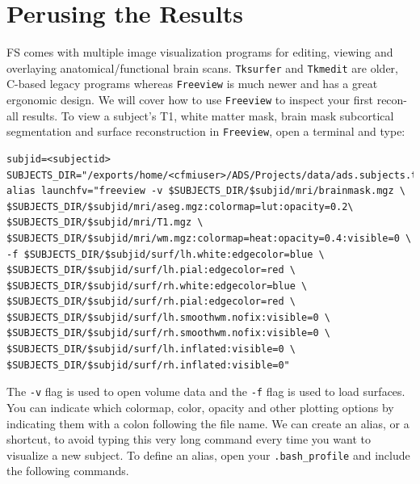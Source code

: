 \documentclass[paper=a4, fontsize=11pt]{scrartcl} %
\numberwithin{equation}{section} %
\numberwithin{figure}{section} %
\numberwithin{table}{section} %
\begin{document}
\section{Perusing the Results}  FS comes with multiple image visualization programs for editing, viewing and overlaying anatomical/functional brain scans.  \texttt{Tksurfer} and \texttt{Tkmedit} are older, C-based legacy programs whereas \texttt{Freeview} is much newer and has a great ergonomic design.  We will cover how to use \texttt{Freeview} to inspect your first recon-all results. To view a subject's T1, white matter mask, brain mask subcortical segmentation and surface reconstruction in \texttt{Freeview}, open a terminal and type:
\begin{lstlisting}[frame=single]
subjid=<subjectid>
SUBJECTS_DIR="/exports/home/<cfmiuser>/ADS/Projects/data/ads.subjects.tutorial"
alias launchfv="freeview -v $SUBJECTS_DIR/$subjid/mri/brainmask.mgz \                                                                               
$SUBJECTS_DIR/$subjid/mri/aseg.mgz:colormap=lut:opacity=0.2\                                                                                        
$SUBJECTS_DIR/$subjid/mri/T1.mgz \                                                                                                                  
$SUBJECTS_DIR/$subjid/mri/wm.mgz:colormap=heat:opacity=0.4:visible=0 \                                                                              
-f $SUBJECTS_DIR/$subjid/surf/lh.white:edgecolor=blue \                                                                                             
$SUBJECTS_DIR/$subjid/surf/lh.pial:edgecolor=red \                                                                                                  
$SUBJECTS_DIR/$subjid/surf/rh.white:edgecolor=blue \                                                                                                
$SUBJECTS_DIR/$subjid/surf/rh.pial:edgecolor=red \                                                                                                  
$SUBJECTS_DIR/$subjid/surf/lh.smoothwm.nofix:visible=0 \                                                                                            
$SUBJECTS_DIR/$subjid/surf/rh.smoothwm.nofix:visible=0 \                                                                                            
$SUBJECTS_DIR/$subjid/surf/lh.inflated:visible=0 \                                                                                                  
$SUBJECTS_DIR/$subjid/surf/rh.inflated:visible=0"
\end{lstlisting}
The \texttt{-v} flag is used to open volume data and the \texttt{-f} flag is used to load surfaces.  You can indicate which colormap, color, opacity and other plotting options by indicating them with a colon following the file name.  We can create an alias, or a shortcut, to avoid typing this very long command every time you want to visualize a new subject.   To define an alias, open your \texttt{.bash\_profile} and include the following commands.
\end{document}
